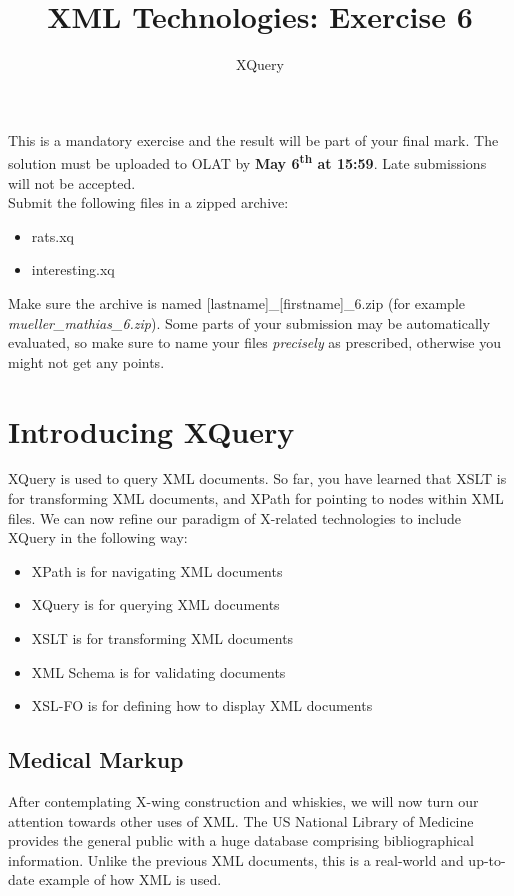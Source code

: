 \documentclass[a4paper, 12pt]{scrartcl}
\title{XML Technologies: Exercise 6}
\date{}
\subtitle{XQuery}
\begin{document}
\maketitle\vspace{-12ex}

\noindent This is a mandatory exercise and the result will be part of your final mark. The solution must be uploaded to OLAT by \textbf{May 6\textsuperscript{th} at 15:59}. Late submissions will not be accepted.\\

\noindent Submit the following files in a zipped archive:
\begin{itemize}
\item rats.xq
\item interesting.xq
\end{itemize}

\noindent Make sure the archive is named [lastname]\_[firstname]\_6.zip (for example \textit{mueller\_mathias\_6.zip}). Some parts of your submission may be automatically evaluated, so make sure to name your files \textit{precisely} as prescribed, otherwise you might not get any points.

\section{Introducing XQuery}

XQuery is used to query XML documents. So far, you have learned that XSLT is for transforming XML documents, and XPath for pointing to nodes within XML files. We can now refine our paradigm of X-related technologies to include XQuery in the following way:
\begin{itemize}
\item XPath is for navigating XML documents
\item XQuery is for querying XML documents
\item XSLT is for transforming XML documents
\item XML Schema is for validating documents
\item XSL-FO is for defining how to display XML documents
\end{itemize}


\subsection{Medical Markup}

After contemplating X-wing construction and whiskies, we will now turn our attention towards other uses of XML. The US National Library of Medicine provides the general public with a huge database comprising bibliographical information. Unlike the previous XML documents, this is a real-world and up-to-date example of how XML is used. \\
\end{document}
